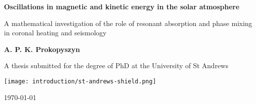 \begin{titlepage}
    \begin{center}
        
        \Huge
        \textbf{Oscillations in magnetic and kinetic energy in the solar atmosphere}
        
        \vspace{0.5cm}
        \LARGE
        A mathematical investigation of the role of resonant absorption and phase mixing in coronal heating and seismology
        
        \vspace{1cm}
        
        \textbf{A. P. K. Prokopyszyn}
        
        \vspace{1cm}
        
        A thesis submitted for the degree of PhD at the University of St Andrews
        
        \vspace{3cm}
        
        \texttt{[image: introduction/st-andrews-shield.png]}
        
        \vspace{0.1cm}
        
        \today
        
    \end{center}
\end{titlepage}



            


            
            
     
            
            
